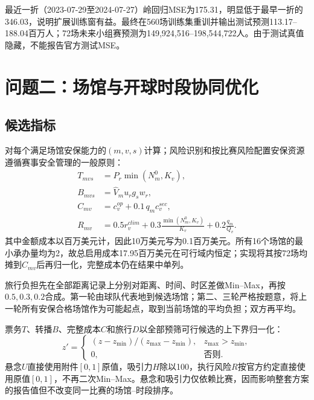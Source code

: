 \documentclass[UTF8,11pt,a4paper]{ctexart}
\begin{document}
最近一折（2023-07-29至2024-07-27）岭回归MSE为175.31，明显低于最早一折的346.03，说明扩展训练窗有益。最终在560场训练集重训并输出测试预测113.17--188.04百万人；72场未来小组赛预测为149,924,516--198,544,722人。由于测试真值隐藏，不能报告官方测试MSE。

\section{问题二：场馆与开球时段协同优化}
\subsection{候选指标}
对每个满足场馆安保能力的$(m,v,s)$计算；风险识别和按比赛风险配置安保资源遵循赛事安全管理的一般原则\cite{fifasec}：
\begin{align}
T_{mvs}&=P_r\min(N_m^{0},K_v),\\
B_{mvs}&=\hat V_m u_r g_s w_r,\\
C_{mv}&=c_v^{op}+0.1\,q_m c_v^{sec},\\
R_{mv}&=0.5r_v^{clim}+0.3\frac{\min(N_m^0,K_v)}{K_v}+0.2\frac{q_m}{Q_v}.
\end{align}
其中金额成本以百万美元计，因此10万美元写为0.1百万美元。所有16个场馆的最小承办量均为2，故总启用成本17.95百万美元在可行域内恒定；实现将其按72场均摊到$C_{mv}$后再归一化，完整成本仍在结果中单列。

旅行负担先在全部距离记录上分别对距离、时间、时区差做Min--Max，再按$0.5,0.3,0.2$合成。第一轮由球队代表地到候选场馆；第二、三轮严格按题意，将上一轮所有安保合格场馆作为可能起点，取到当前场馆的平均负担；双方再平均。

票务$T$、转播$B$、完整成本$C$和旅行$D$以全部预筛可行候选的上下界归一化：
\begin{equation}
z'=\begin{cases}(z-z_{\min})/(z_{\max}-z_{\min}),&z_{\max}>z_{\min},\\0,&\text{否则}.\end{cases}
\end{equation}
悬念$U$直接使用附件$[0,1]$原值，吸引力$H$除以100，执行风险$R$按官方约定直接使用原值$[0,1]$，不再二次Min--Max。悬念和吸引力仅依赖比赛，因而影响整套方案的报告值但不改变同一比赛的场馆--时段排序。
\end{document}
